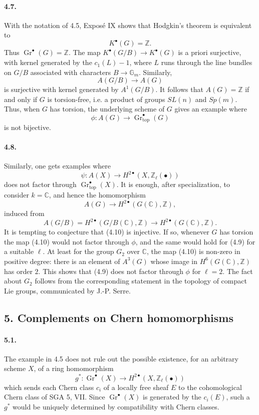 \documentclass[11pt]{article}
\theoremstyle{plain}
\theoremstyle{definition}
\theoremstyle{remark}
\newcommand{\CC}{\mathbb C}
\newcommand{\GG}{\mathbb G}
\newcommand{\ZZ}{\mathbb Z}
\DeclareMathOperator{\Gr}{Gr}
\newcommand{\longto}{\longrightarrow}
\providecommand{\topf}{\mathrm{top}}
\begin{document}
\paragraph{4.7.}
With the notation of 4.5, Exposé IX shows that Hodgkin's theorem is equivalent to
\[
K^\bullet(G)=\ZZ.
\]
Thus $\Gr^\bullet(G)=\ZZ$. The map $K^\bullet(G/B)\to K^\bullet(G)$ is a priori surjective, with kernel generated by the $c_1(L)-1$, where $L$ runs through the line bundles on $G/B$ associated with characters $B\to \GG_m$. Similarly,
\[
A(G/B)\to A(G)
\]
is surjective with kernel generated by $A^1(G/B)$. It follows that $A(G)=\ZZ$ if and only if $G$ is torsion-free, i.e. a product of groups $SL(n)$ and $Sp(m)$. Thus, when $G$ has torsion, the underlying scheme of $G$ gives an example where
\[
\phi:A(G)\to\Gr^\bullet_{\topf}(G)
\]
is not bijective.

\paragraph{4.8.}
Similarly, one gets examples where
\[
\psi:A(X)\to H^{2\bullet}(X,\ZZ_\ell(\bullet))
\tag{4.9}
\]
does not factor through $\Gr^\bullet_{\topf}(X)$. It is enough, after specialization, to consider $k=\CC$, and hence the homomorphism
\[
A(G)\to H^{2\bullet}(G(\CC),\ZZ),
\tag{4.10}
\]
induced from
\[
A(G/B)=H^{2\bullet}(G/B(\CC),\ZZ)\to H^{2\bullet}(G(\CC),\ZZ).
\]
It is tempting to conjecture that (4.10) is injective. If so, whenever $G$ has torsion the map (4.10) would not factor through $\phi$, and the same would hold for (4.9) for a suitable $\ell$. At least for the group $G_2$ over $\CC$, the map (4.10) is non-zero in positive degree: there is an element of $A^3(G)$ whose image in $H^6(G(\CC),\ZZ)$ has order $2$. This shows that (4.9) does not factor through $\phi$ for $\ell=2$. The fact about $G_2$ follows from the corresponding statement in the topology of compact Lie groups, communicated by J.-P. Serre.

\subsection*{5. Complements on Chern homomorphisms}

\paragraph{5.1.}
The example in 4.5 does not rule out the possible existence, for an arbitrary scheme $X$, of a ring homomorphism
\[
g^*:\Gr^\bullet(X)\longto H^{2\bullet}(X,\ZZ_\ell(\bullet))
\]
which sends each Chern class $c_i$ of a locally free sheaf $E$ to the cohomological Chern class of SGA 5, VII. Since $\Gr^\bullet(X)$ is generated by the $c_i(E)$, such a $g^*$ would be uniquely determined by compatibility with Chern classes.
\end{document}
